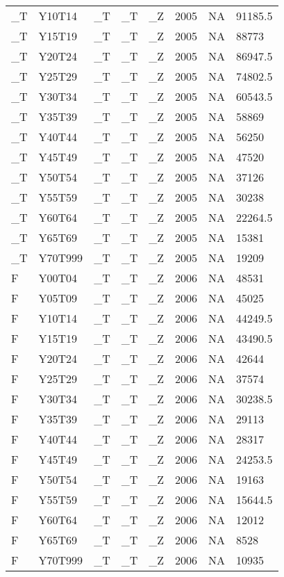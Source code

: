 \begin{longtable}[t]{llllllll}
\_T & Y10T14 & \_T & \_T & \_Z & 2005 & NA & 91185.5\\
\addlinespace
\_T & Y15T19 & \_T & \_T & \_Z & 2005 & NA & 88773\\
\_T & Y20T24 & \_T & \_T & \_Z & 2005 & NA & 86947.5\\
\_T & Y25T29 & \_T & \_T & \_Z & 2005 & NA & 74802.5\\
\_T & Y30T34 & \_T & \_T & \_Z & 2005 & NA & 60543.5\\
\_T & Y35T39 & \_T & \_T & \_Z & 2005 & NA & 58869\\
\addlinespace
\_T & Y40T44 & \_T & \_T & \_Z & 2005 & NA & 56250\\
\_T & Y45T49 & \_T & \_T & \_Z & 2005 & NA & 47520\\
\_T & Y50T54 & \_T & \_T & \_Z & 2005 & NA & 37126\\
\_T & Y55T59 & \_T & \_T & \_Z & 2005 & NA & 30238\\
\_T & Y60T64 & \_T & \_T & \_Z & 2005 & NA & 22264.5\\
\addlinespace
\_T & Y65T69 & \_T & \_T & \_Z & 2005 & NA & 15381\\
\_T & Y70T999 & \_T & \_T & \_Z & 2005 & NA & 19209\\
F & Y00T04 & \_T & \_T & \_Z & 2006 & NA & 48531\\
F & Y05T09 & \_T & \_T & \_Z & 2006 & NA & 45025\\
F & Y10T14 & \_T & \_T & \_Z & 2006 & NA & 44249.5\\
\addlinespace
F & Y15T19 & \_T & \_T & \_Z & 2006 & NA & 43490.5\\
F & Y20T24 & \_T & \_T & \_Z & 2006 & NA & 42644\\
F & Y25T29 & \_T & \_T & \_Z & 2006 & NA & 37574\\
F & Y30T34 & \_T & \_T & \_Z & 2006 & NA & 30238.5\\
F & Y35T39 & \_T & \_T & \_Z & 2006 & NA & 29113\\
\addlinespace
F & Y40T44 & \_T & \_T & \_Z & 2006 & NA & 28317\\
F & Y45T49 & \_T & \_T & \_Z & 2006 & NA & 24253.5\\
F & Y50T54 & \_T & \_T & \_Z & 2006 & NA & 19163\\
F & Y55T59 & \_T & \_T & \_Z & 2006 & NA & 15644.5\\
F & Y60T64 & \_T & \_T & \_Z & 2006 & NA & 12012\\
\addlinespace
F & Y65T69 & \_T & \_T & \_Z & 2006 & NA & 8528\\
F & Y70T999 & \_T & \_T & \_Z & 2006 & NA & 10935\\

\end{longtable}

